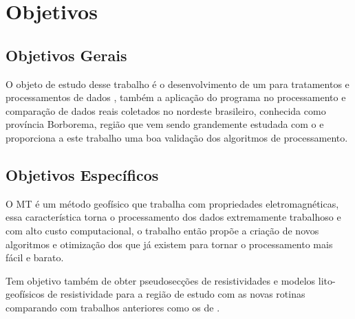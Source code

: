 
\chapter{Objetivos}
\label{cap-objetivos}

\section{Objetivos Gerais}
\label{cap-objetivos gerais}

    
    O objeto de estudo desse trabalho é o desenvolvimento de um  para tratamentos e processamentos de dados \MT, também a aplicação do programa no processamento e comparação de dados reais coletados no nordeste brasileiro, conhecida como província Borborema, região que vem sendo grandemente estudada com o \MT e proporciona a este trabalho uma boa validação dos algoritmos de processamento.   

\section{Objetivos Específicos}
\label{cap-objetivos especificos}

    O MT é um método geofísico que trabalha com propriedades eletromagnéticas, essa característica torna o processamento dos dados extremamente trabalhoso e com alto custo computacional, o trabalho então propõe a criação de novos algoritmos e otimização dos que já existem para tornar o processamento mais fácil e barato.
    
    Tem objetivo também de obter pseudosecções de resistividades e modelos lito-geofísicos de resistividade para a região de estudo com as novas rotinas comparando com trabalhos anteriores como os de .
